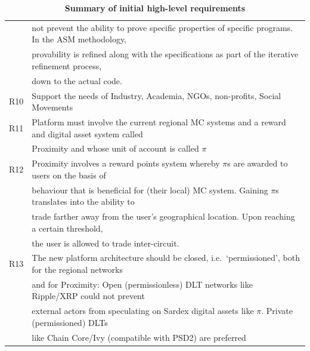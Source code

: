 \begin{table}[htbp]
\begin{centering}
{\begin{tabular}{| l | l | }
&\hspace{0.5cm}not prevent the ability to prove specific properties of specific programs. In the ASM methodology,\\
&\hspace{0.5cm}provability is refined along with the specifications as part of the iterative refinement process,\\
&\hspace{0.5cm}down to the actual code.\\
\hline
R10 &Support the needs of Industry, Academia, NGOs, non-profits, Social Movements\\
\hline
R11 &Platform must involve the current regional MC systems and a reward and digital asset system called\\
&\hspace{0.5cm}Proximity and whose unit of account is called $\pi$\\
\hline
R12 &Proximity involves a reward points system whereby $\pi$s are awarded to users on the basis of\\
&\hspace{0.5cm}behaviour that is beneficial for (their local) MC system. Gaining $\pi$s translates into the ability to\\
&\hspace{0.5cm}trade farther away from the user's geographical location. Upon reaching a certain threshold,\\
&\hspace{0.5cm}the user is allowed to trade inter-circuit.  \\
\hline
R13 &The new platform architecture should be closed, i.e.\ `permissioned', both for the regional networks\\
&\hspace{0.5cm}and for Proximity: Open (permissionless) DLT networks like Ripple/XRP could not prevent\\
&\hspace{0.5cm}external actors from speculating on Sardex digital assets like $\pi$. Private (permissioned) DLTs\\
&\hspace{0.5cm}like Chain Core/Ivy (compatible with PSD2) are preferred \\
\hline
\end{tabular}}
\caption{\small\textbf{Summary of initial high-level requirements}}
\label{ReqTable}
\end{centering}
\end{table}

